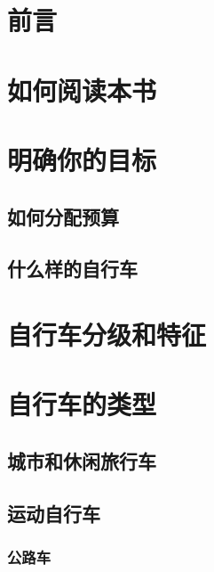 \documentclass[11pt]{book}
\begin{document}
    \tableofcontents
    \chapter*{前言}
    

    \chapter{如何阅读本书}\label{ch:how2read}
    

    \chapter{明确你的目标}\label{ch:setGoal}
    

    \section{如何分配预算}\label{sec:budget}
    

    \section{什么样的自行车}\label{sec:whichBike}
    

    \chapter{自行车分级和特征}\label{ch:grade&feature}
    

    \chapter{自行车的类型}\label{ch:types}
    

    \section{城市和休闲旅行车}\label{sec:urban&travel}
    

    \section{运动自行车}\label{sec:sports}
    

    \subsection{公路车}\label{subsec:road}
    
\end{document}
